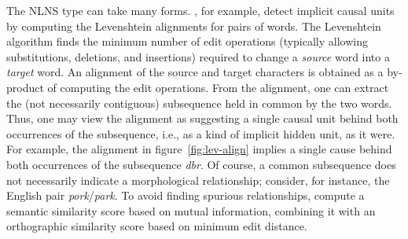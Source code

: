 The NLNS type can take many forms. 
\cite{baroni-et-al:2002}, for example, detect implicit causal units by computing the Levenshtein alignments for pairs of words. 
The Levenshtein algorithm finds the minimum number of edit operations 
(typically allowing substitutions, deletions, and insertions) required to change 
a \textit{source} word into a \textit{target} word.
An alignment of the source and target characters is obtained as a by-product of computing the edit operations. 
From the alignment, one can extract the (not necessarily contiguous) subsequence held in common by the two words.
Thus, one may view the alignment as suggesting a single causal unit behind both occurrences of the subsequence, i.e., as a kind of implicit hidden unit, as it were.
For example, the alignment in figure~\ref{fig:lev-align} implies a single cause behind both occurrences of the subsequence \textit{dbr}.
Of course, a common subsequence does not necessarily indicate a morphological relationship; 
consider, for instance, the English pair \textit{pork}/\textit{park}. 
To avoid finding spurious relationships, 
\cite{baroni-et-al:2002} compute a semantic similarity score based on mutual information, 
combining it with an orthographic similarity score based on minimum edit distance.

